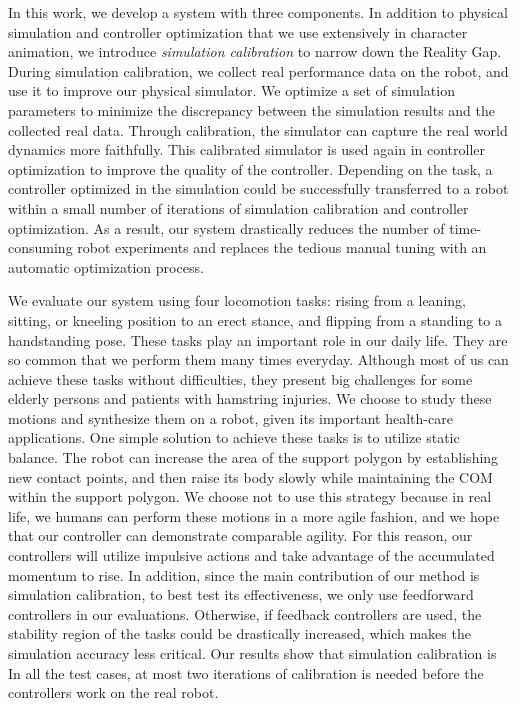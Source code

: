   In this work, we develop a system with three components. In addition to physical simulation and controller optimization that we use extensively in character animation, we introduce \emph{simulation calibration} to narrow down the Reality Gap. During simulation calibration, we collect real performance data on the robot, and use it to improve our physical simulator. We optimize a set of simulation parameters to minimize the discrepancy between the simulation results and the collected real data. Through calibration, the simulator can capture the real world dynamics more faithfully. This calibrated simulator is used again in controller optimization to improve the quality of the controller. Depending on the task, a controller optimized in the simulation could be successfully transferred to a robot within a small number of iterations of simulation calibration and controller optimization. As a result, our system drastically reduces the number of time-consuming robot experiments and replaces the tedious manual tuning with an automatic optimization process. 

We evaluate our system using four locomotion tasks: rising from a leaning, sitting, or kneeling position to an erect stance, and flipping from a standing to a handstanding pose. These tasks play an important role in our daily life. They are so common that we perform them many times everyday. Although most of us can achieve these tasks without difficulties, they present big challenges for some elderly persons and patients with hamstring injuries. We choose to study these motions and synthesize them on a robot, given its important health-care applications. One simple solution to achieve these tasks is to utilize static balance. The robot can increase the area of the support polygon by establishing new contact points, and then raise its body slowly while maintaining the COM within the support polygon. We choose not to use this strategy because in real life, we humans can perform these motions in a more agile fashion, and we hope that our controller can demonstrate comparable agility. For this reason, our controllers will utilize impulsive actions and take advantage of the accumulated momentum to rise. In addition, since the main contribution of our method is simulation calibration, to best test its effectiveness, we only use feedforward controllers in our evaluations. Otherwise, if feedback controllers are used, the stability region of the tasks could be drastically increased, which makes the simulation accuracy less critical. Our results show that simulation calibration is   In all the test cases, at most two iterations of calibration is needed before the controllers work on the real robot.

